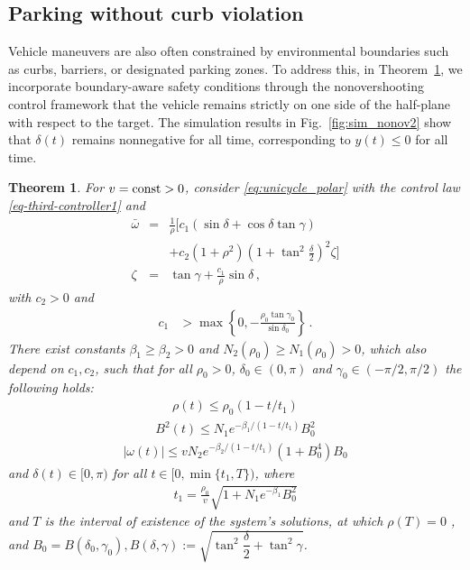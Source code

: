 \documentclass[letterpaper, 10 pt, conference]{ieeeconf}  %
\newtheorem{theorem}{Theorem}
\begin{document}
\subsection{Parking without curb violation}

Vehicle maneuvers are also often constrained by environmental boundaries such as curbs, barriers, or designated parking zones. To address this, in Theorem~\ref{thm:nonov2}, we incorporate boundary-aware safety conditions through the nonovershooting control framework \cite{krstic_nonovershooting_2006} that the vehicle remains strictly on one side of the half-plane with respect to the target. The simulation results in Fig.~\ref{fig:sim_nonov2} show that $\delta(t)$ remains nonnegative for all time, corresponding to $y(t) \leq 0$ for all time.

\begin{theorem}\label{thm:nonov2}
For $v=\mbox{\rm const}>0$, consider \eqref{eq:unicycle_polar}
with the control law  \eqref{eq-third-controller1} and
\begin{subequations}
\label{eq-nonovershoot2}
\begin{eqnarray}
\label{eq-nonovershoot_omegabar2}
\bar\omega &=& \frac{1}{\rho}\biggl[c_1(\sin\delta + \cos\delta\tan\gamma)\nonumber\\
&&+ c_2(1+\rho^2)\left(1+\tan^2\frac{\delta}{2}\right)^2 \zeta\biggr]
\\
\label{eq-nonovershoot_zeta2}
\zeta &=& \tan\gamma + \frac{c_1}{\rho}\sin\delta\,,
\end{eqnarray}
\end{subequations}
with $c_2 > 0$ and
\begin{align}
c_1 &> \max\left\{0,-\frac{\rho_0\tan\gamma_0}{\sin\delta_0}\right\}\label{eq:nonov2_c1}\,.
\end{align}
There exist constants $\beta_1 \geq \beta_2 > 0$ and $N_2(\rho_0) \geq N_1(\rho_0) > 0$, which also depend on $c_1,c_2$, such that for all $\rho_0 >0$, $\delta_0 \in (0,\pi)$ and $\gamma_0 \in (-\pi/2,\pi/2)$ the following holds:
\begin{align}\label{eq:nonov_rho_bound2}
\rho(t) \leq \rho_0(1-t/t_1)
\end{align}
\begin{align}\label{eq:nonov_deltan_bound2}
B^2(t)\leq N_1e^{-\beta_1/(1-t/t_1)}B^2_0
\end{align}
\begin{align}\label{eq:nonov_omega_bound2}
|\omega(t)| \leq vN_2e^{-\beta_2/(1-t/t_1)}\left(1+B_0^4\right)B_0
\end{align}
and $\delta(t) \in [0,\pi)$ for all $t \in [0, \min\{t_1,T\})$, where 
\begin{align}
t_1
= \frac{\rho_0}{v}\sqrt{1+ N_1e^{-\beta_1}B_0^2}
\end{align}
and $T$ is the interval of existence of the system's solutions, at which $\rho(T) = 0$ , and $B_0=B(\delta_0,\gamma_0), B(\delta,\gamma) := \sqrt{\tan^2\dfrac{\delta}{2} +\tan^2\gamma}$. 
\end{theorem}
\end{document}
